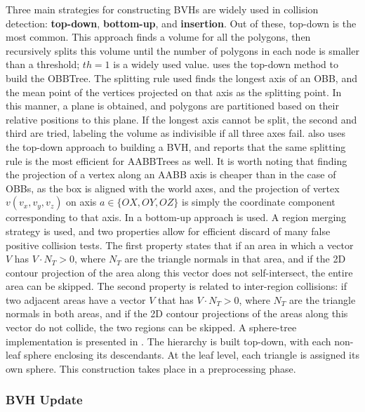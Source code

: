 Three main strategies for constructing BVHs are widely used in collision detection: \textbf{top-down}, \textbf{bottom-up}, and \textbf{insertion}. Out of these, top-down is the most common. This approach finds a volume for all the polygons, then recursively splits this volume until the number of polygons in each node is smaller than a threshold; $th = 1$ is a widely used value. \cite{gott96} uses the top-down method to build the OBBTree. The splitting rule used finds the longest axis of an OBB, and the mean point of the vertices projected on that axis as the splitting point. In this manner, a plane is obtained, and polygons are partitioned based on their relative positions to this plane. If the longest axis cannot be split, the second and third are tried, labeling the volume as indivisible if all three axes fail. \citep{vdb97} also uses the top-down approach to building a BVH, and reports that the same splitting rule is the most efficient for AABBTrees as well. It is worth noting that finding the projection of a vertex along an AABB axis is cheaper than in the case of OBBs, as the box is aligned with the world axes, and the projection of vertex $v(v_{x}, v_{y}, v_{z})$ on axis $a \in \{OX, OY, OZ\}$ is simply the coordinate component corresponding to that axis. In \citep{vmt95} a bottom-up approach is used. A region merging strategy is used, and two properties allow for efficient discard of many false positive collision tests. The first property states that if an area in which a vector $V$ has $V \cdot N_{T} > 0$, where $N_{T}$ are the triangle normals in that area, and if the 2D contour projection of the area along this vector does not self-intersect, the entire area can be skipped. The second property is related to inter-region collisions: if two adjacent areas have a vector $V$ that has $V \cdot N_{T} > 0$, where $N_{T}$ are the triangle normals in both areas, and if the 2D contour projections of the areas along this vector do not collide, the two regions can be skipped. A sphere-tree implementation is presented in \citep{rtsd01}. The hierarchy is built top-down, with each non-leaf sphere enclosing its descendants. At the leaf level, each triangle is assigned its own sphere. This construction takes place in a preprocessing phase.


\subsubsection{BVH Update}
\label{sub-sub-sec:bvhupdate}

